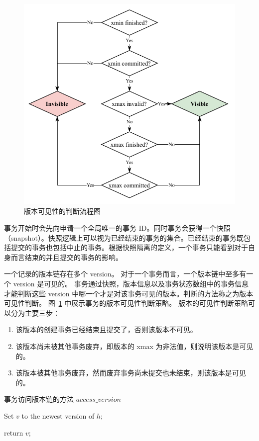 \begin{figure}[ht]
    \centering
    \includegraphics[width=1\linewidth]{figures/version_visibility.pdf}
    \caption{版本可见性的判断流程图}
    \label{fig:version-visibility}
\end{figure}

事务开始时会先向申请一个全局唯一的事务 ID。同时事务会获得一个快照 （snapshot）。快照逻辑上可以视为已经结束的事务的集合。已经结束的事务既包括提交的事务也包括中止的事务。根据快照隔离的定义，一个事务只能看到对于自身而言结束的并且提交的事务的影响。

一个记录的版本链存在多个 version。
对于一个事务而言，一个版本链中至多有一个 version 是可见的。
事务通过快照，版本信息以及事务状态数组中的事务信息才能判断这些 version 中哪一个才是对该事务可见的版本。判断的方法称之为版本可见性判断。
图~\ref{fig:version-visibility} 中展示事务的版本可见性判断策略。
版本的可见性判断策略可以分为主要三步：
\begin{enumerate}
    \item 该版本的创建事务已经结束且提交了，否则该版本不可见。
    \item 该版本尚未被其他事务废弃，即版本的 xmax 为非法值，则说明该版本是可见的。
    \item 该版本被其他事务废弃，然而废弃事务尚未提交也未结束，则该版本是可见的。
\end{enumerate}


\begin{algorithm}[ht]
    \caption{事务访问版本链的方法 $access\_version$}
    \label{alg:traverse_version_chain}
    \BlankLine

    Set $v$ to the newest version of $h$;


    return $v$;

\end{algorithm}

